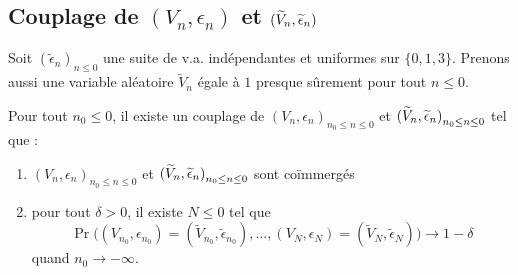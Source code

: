 \documentclass[12pt,a4paper]{article}
\begin{document}
\subsection{Couplage de $(V_n,\epsilon_n)$ et $(\widetilde{V}_n, \widetilde{\epsilon}_n)$}

Soit ${(\widetilde{\epsilon}_n)}_{n \leq 0}$ une suite de v.a. indépendantes 
et uniformes sur $\{0,1,3\}$. 
 Prenons aussi une variable aléatoire $\widetilde{V}_n$ égale à $1$ 
presque sûrement pour tout $n \leq 0$. 

\begin{lemme}\label{lemme:joining_epsilon}
Pour tout $n_0 \leq 0$, il existe un couplage de 
${(V_n, \epsilon_n)}_{n_0 \leq n \leq 0}$ et 
 ${(\widetilde{V}_n, \widetilde{\epsilon}_n)}_{n_0 \leq  n \leq 0}$ tel que :
\begin{enumerate}
\item ${(V_n, \epsilon_n)}_{n_0 \leq n \leq 0}$ et 
 ${(\widetilde{V}_n, \widetilde{\epsilon}_n)}_{n_0 \leq  n \leq 0}$ sont coïmmergés 
 
\item pour tout $\delta >0$, il existe $N \leq 0$ tel que   
$$
\Pr\bigl((V_{n_0}, \epsilon_{n_0})=(\widetilde{V}_{n_0}, \widetilde{\epsilon}_{n_0}), 
\ldots, (V_N, \epsilon_{N})=(\widetilde{V}_{N},\widetilde{\epsilon}_{N})\bigr) \to 1-\delta 
$$  
quand $n_0 \to -\infty$. 
\end{enumerate}
\end{lemme}
\end{document}
